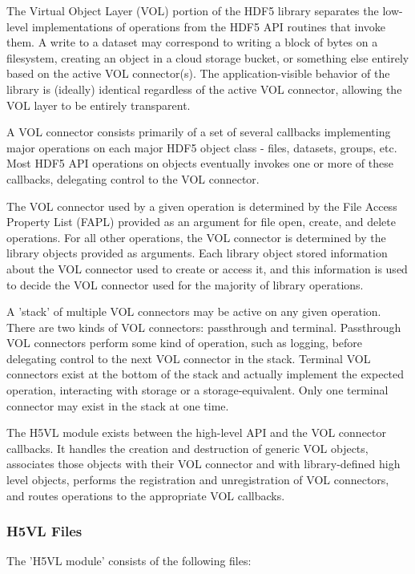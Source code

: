 \documentclass{article}
\begin{document}
The Virtual Object Layer (VOL) portion of the HDF5 library separates the low-level implementations of operations from the HDF5 API routines that invoke them. A write to a dataset may correspond to writing a block of bytes on a filesystem, creating an object in a cloud storage bucket, or something else entirely based on the active VOL connector(s). The application-visible behavior of the library is (ideally) identical regardless of the active VOL connector, allowing the VOL layer to be entirely transparent.

A VOL connector consists primarily of a set of several callbacks implementing major operations on each major HDF5 object class - files, datasets, groups, etc. Most HDF5 API operations on objects eventually invokes one or more of these callbacks, delegating control to the VOL connector. 

The VOL connector used by a given operation is determined by the File Access Property List (FAPL) provided as an argument for file open, create, and delete operations. For all other operations, the VOL connector is determined by the library objects provided as arguments. Each library object stored information about the VOL connector used to create or access it, and this information is used to decide the VOL connector used for the majority of library operations.

A 'stack' of multiple VOL connectors may be active on any given operation. There are two kinds of VOL connectors: passthrough and terminal. Passthrough VOL connectors perform some kind of operation, such as logging, before delegating control to the next VOL connector in the stack. Terminal VOL connectors exist at the bottom of the stack and actually implement the expected operation, interacting with storage or a storage-equivalent. Only one terminal connector may exist in the stack at one time.

The H5VL module exists between the high-level API and the VOL connector callbacks. It handles the creation and destruction of generic VOL objects, associates those objects with their VOL connector and with library-defined high level objects, performs the registration and unregistration of VOL connectors, and routes operations to the appropriate VOL callbacks.

\subsubsection{H5VL Files}
The 'H5VL module' consists of the following files:
\end{document}
